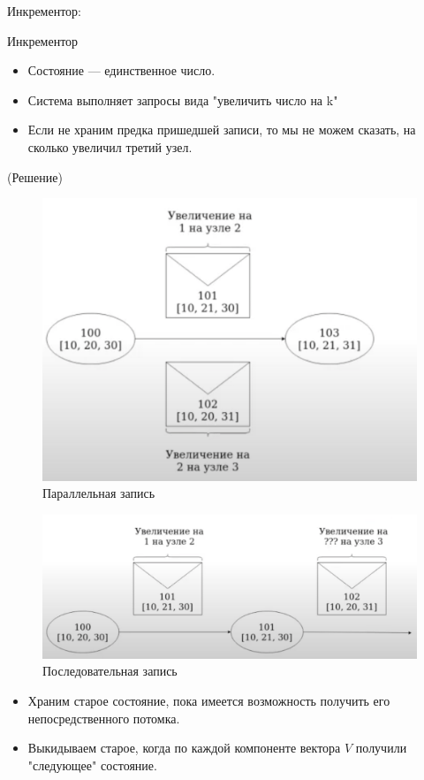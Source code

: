     \begin{example}
      Инкрементор:\\
      \begin{definition}
      Инкрементор
      \end{definition}
        \begin{itemize}
          \item Состояние --- единственное число.
          \item Система выполняет запросы вида "увеличить число на k"
          \item Если не храним предка пришедшей записи, то мы не можем сказать, на сколько увеличил третий узел.
        \end{itemize}
        \begin{algorithm}(Решение)
          \begin{figure}[h]
              \centering
              \includegraphics[scale = 0.5]{../assets/15.png}
              \caption{Параллельная запись}
          \end{figure}
          \begin{figure}[h]
              \centering
              \includegraphics[scale = 0.5]{../assets/16.png}
              \caption{Последовательная запись}
          \end{figure}
          \begin{itemize}
            \item Храним старое состояние, пока имеется возможность получить его непосредственного потомка.
            \item Выкидываем старое, когда по каждой компоненте вектора $V$ получили "следующее" состояние.
          \end{itemize}
        \end{algorithm}
    \end{example}
